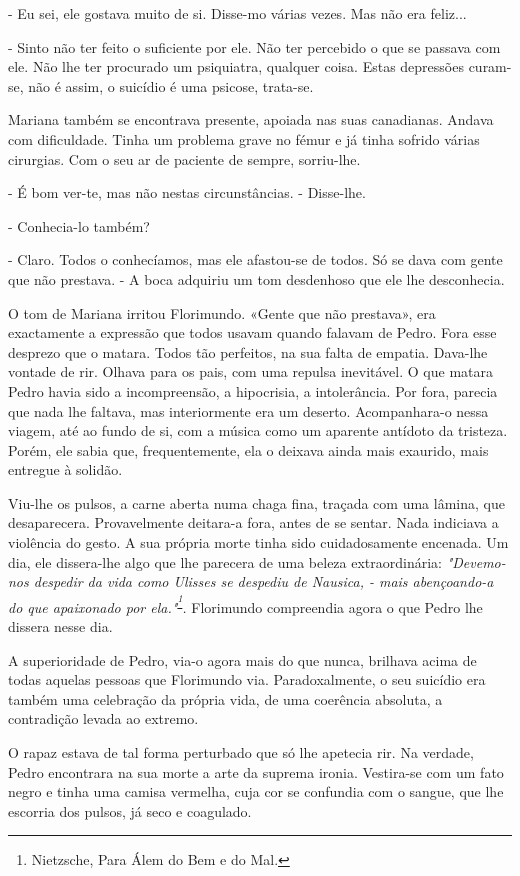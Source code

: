 - Eu sei, ele gostava muito de si. Disse-mo várias vezes. Mas não era
feliz...

- Sinto não ter feito o suficiente por ele. Não ter percebido o que se
passava com ele. Não lhe ter procurado um psiquiatra, qualquer coisa.
Estas depressões curam-se, não é assim, o suicídio é uma psicose,
trata-se.

Mariana também se encontrava presente, apoiada nas suas canadianas.
Andava com dificuldade. Tinha um problema grave no fémur e já tinha
sofrido várias cirurgias. Com o seu ar de paciente de sempre,
sorriu-lhe.

- É bom ver-te, mas não nestas circunstâncias. - Disse-lhe.

- Conhecia-lo também?

- Claro. Todos o conhecíamos, mas ele afastou-se de todos. Só se dava
com gente que não prestava. - A boca adquiriu um tom desdenhoso que ele
lhe desconhecia.

O tom de Mariana irritou Florimundo. «Gente que não prestava», era
exactamente a expressão que todos usavam quando falavam de Pedro. Fora
esse desprezo que o matara. Todos tão perfeitos, na sua falta de
empatia. Dava-lhe vontade de rir. Olhava para os pais, com uma repulsa
inevitável. O que matara Pedro havia sido a incompreensão, a hipocrisia,
a intolerância. Por fora, parecia que nada lhe faltava, mas
interiormente era um deserto. Acompanhara-o nessa viagem, até ao fundo
de si, com a música como um aparente antídoto da tristeza. Porém, ele
sabia que, frequentemente, ela o deixava ainda mais exaurido, mais
entregue à solidão.

Viu-lhe os pulsos, a carne aberta numa chaga fina, traçada com uma
lâmina, que desaparecera. Provavelmente deitara-a fora, antes de se
sentar. Nada indiciava a violência do gesto. A sua própria morte tinha
sido cuidadosamente encenada. Um dia, ele dissera-lhe algo que lhe
parecera de uma beleza extraordinária: \emph{"Devemo-nos despedir da
vida como Ulisses se despediu de Nausica, - mais abençoando-a do que
apaixonado por ela."}\textsuperscript{\emph{\footnote{Nietzsche, Para
  Álem do Bem e do Mal.}}}\emph{. }Florimundo compreendia agora o que
Pedro lhe dissera nesse dia.

A superioridade de Pedro, via-o agora mais do que nunca, brilhava acima
de todas aquelas pessoas que Florimundo via. Paradoxalmente, o seu
suicídio era também uma celebração da própria vida, de uma coerência
absoluta, a contradição levada ao extremo.

O rapaz estava de tal forma perturbado que só lhe apetecia rir. Na
verdade, Pedro encontrara na sua morte a arte da suprema ironia.
Vestira-se com um fato negro e tinha uma camisa vermelha, cuja cor se
confundia com o sangue, que lhe escorria dos pulsos, já seco e
coagulado.

